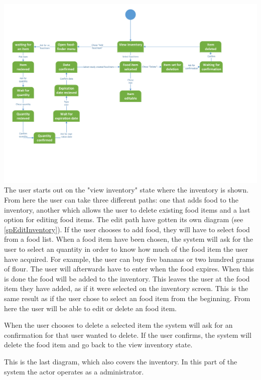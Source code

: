 \includegraphics[width=1.0\textwidth]{ApplicationDomain/spViewInventory.pdf} \label{Inventory_Figure}
The user starts out on the "view inventory" state where the inventory is shown. From here the user can take three different paths: one that adds food to the inventory, another which allows the user to delete existing food items and a last option for editing food items. The edit path have gotten its own diagram (see \ref{spEditInventory}). If the user chooses to add food, they will have to select food from a food list. When a food item have been chosen, the system will ask for the user to select an quantity in order to know how much of the food item the user have acquired. For example, the user can buy five bananas or two hundred grams of flour. The user will afterwards have to enter when the food expires. When this is done the food will be added to the inventory. This leaves the user at the food item they have added, as if it were selected on the inventory screen. This is the same result as if the user chose to select an food item from the beginning. From here the user will be able to edit or delete an food item. 

When the user chooses to delete a selected item the system will ask for an confirmation for that user wanted to delete. If the user confirms, the system will delete the food item and go back to the view inventory state.


This is the last diagram, which also covers the inventory. In this part of the system the actor operates as a administrator.

